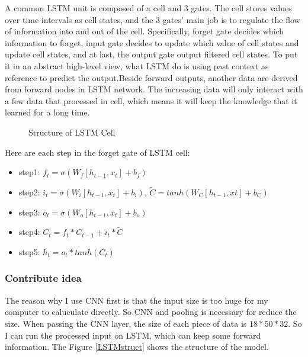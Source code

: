 \documentclass{article}
\begin{document}
A common LSTM unit is composed of a cell and 3 gates. The cell stores values over time intervals as cell states, and the 3 gates’ main job is to regulate the flow of information into and out of the cell. Specifically, forget gate decides which information to forget, input gate decides to update which value of cell states and update cell states, and at last, the output gate output filtered cell states. To put it in an abstract high-level view, what LSTM do is using past context as reference to predict the output.Beside forward outputs, another data are derived from forward nodes in LSTM network. The increasing data will only interact with a few data that processed in cell, which means it will keep the knowledge that it learned for a long time.

\begin{figure}[h]
  \centering
  \caption{Structure of LSTM Cell}
\end{figure} 


Here are each step in the forget gate of LSTM cell:
\begin{itemize}
\item step1: $f_t = \sigma(W_f[h_{t-1}, x_t] + b_f)$
\item step2: $i_t = \sigma(W_i[h_{t-1}, x_t] + b_i)$,  $\widetilde{C} = tanh(W_C[h_{t-1}, xt] + b_C)$
\item step3: $o_t=\sigma(W_o[h_{t-1}, x_t] + b_o)$
\item step4: $C_t = f_t*C_{t-1} + i_t*\widetilde{C}$
\item step5: $h_t=o_t*tanh(C_t)$
\end{itemize}

\subsubsection{Contribute idea}
The reason why I use CNN first is that the input size is too huge for my computer to caluculate directly. So CNN and pooling is necessary for reduce the size. When passing the CNN layer, the size of each piece of data is $18*50*32$. So I can run the processed input on LSTM, which can keep some forward information. The Figure \ref{LSTMstruct} shows the structure of the model.
\end{document}
